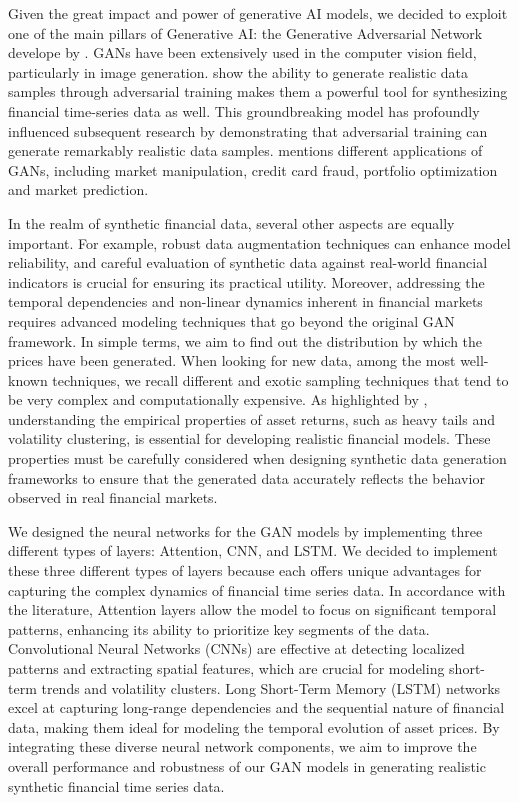 \documentclass{article}
\begin{document}
Given the great impact and power of generative AI models, we decided to exploit one of the main pillars of Generative AI: the Generative Adversarial Network develope by \textcite{goodfellow_generative_2014}. GANs have been extensively used in the computer vision field, particularly in image generation. \textcite{iglesias_survey_2023} show the ability to generate realistic data samples through adversarial training makes them a powerful tool for synthesizing financial time-series data as well. This groundbreaking model has profoundly influenced subsequent research by demonstrating that adversarial training can generate remarkably realistic data samples. \textcite{EckerliFlorian2021GANi} mentions different applications of GANs, including market manipulation, credit card fraud, portfolio optimization and market prediction.

In the realm of synthetic financial data, several other aspects are equally important. For example, robust data augmentation techniques can enhance model reliability, and careful evaluation of synthetic data against real-world financial indicators is crucial for ensuring its practical utility. Moreover, addressing the temporal dependencies and non-linear dynamics inherent in financial markets requires advanced modeling techniques that go beyond the original GAN framework. In simple terms, we aim to find out the distribution by which the prices have been generated. When looking for new data, among the most well-known techniques, we recall different and exotic sampling techniques that tend to be very complex and computationally expensive. As highlighted by \textcite{cont_empirical_2001}, understanding the empirical properties of asset returns, such as heavy tails and volatility clustering, is essential for developing realistic financial models. These properties must be carefully considered when designing synthetic data generation frameworks to ensure that the generated data accurately reflects the behavior observed in real financial markets.

We designed the neural networks for the GAN models by implementing three different types of layers: Attention, CNN, and LSTM. We decided to implement these three different types of layers because each offers unique advantages for capturing the complex dynamics of financial time series data. In accordance with the literature, Attention layers allow the model to focus on significant temporal patterns, enhancing its ability to prioritize key segments of the data. Convolutional Neural Networks (CNNs) are effective at detecting localized patterns and extracting spatial features, which are crucial for modeling short-term trends and volatility clusters. Long Short-Term Memory (LSTM) networks excel at capturing long-range dependencies and the sequential nature of financial data, making them ideal for modeling the temporal evolution of asset prices. By integrating these diverse neural network components, we aim to improve the overall performance and robustness of our GAN models in generating realistic synthetic financial time series data.
\end{document}
